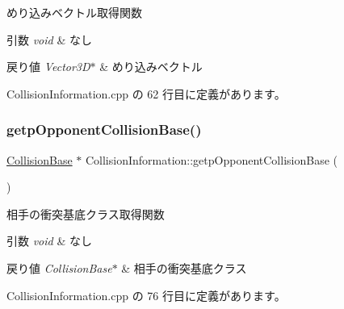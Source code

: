 めり込みベクトル取得関数 


\begin{DoxyParams}{引数}
{\em void} & なし \\
\hline
\end{DoxyParams}

\begin{DoxyRetVals}{戻り値}
{\em Vector3\+D$\ast$} & めり込みベクトル \\
\hline
\end{DoxyRetVals}


 Collision\+Information.\+cpp の 62 行目に定義があります。

\mbox{\label{class_collision_information_a957c277459c059bf43d344c23474820c}} 
\subsubsection{\texorpdfstring{getp\+Opponent\+Collision\+Base()}{getpOpponentCollisionBase()}}
{\footnotesize\ttfamily \mbox{\hyperlink{class_collision_base}{Collision\+Base}} $\ast$ Collision\+Information\+::getp\+Opponent\+Collision\+Base (\begin{DoxyParamCaption}{ }\end{DoxyParamCaption})}



相手の衝突基底クラス取得関数 


\begin{DoxyParams}{引数}
{\em void} & なし \\
\hline
\end{DoxyParams}

\begin{DoxyRetVals}{戻り値}
{\em Collision\+Base$\ast$} & 相手の衝突基底クラス \\
\hline
\end{DoxyRetVals}


 Collision\+Information.\+cpp の 76 行目に定義があります。

\mbox{\label{class_collision_information_af0182f7a9bb517b4a10a0e1e22a0b972}} 

